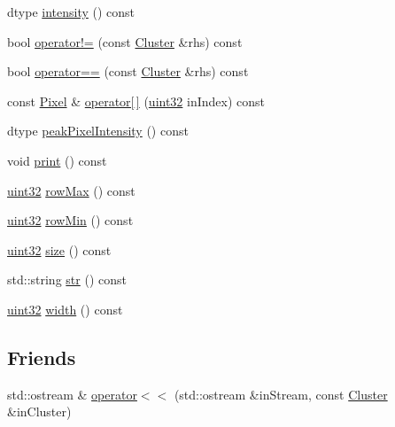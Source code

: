 \begin{DoxyCompactItemize}
\item 
dtype \mbox{\hyperlink{class_num_c_1_1_image_processing_1_1_cluster_ad68801ae625be617a59bff60131b34e6}{intensity}} () const
\item 
bool \mbox{\hyperlink{class_num_c_1_1_image_processing_1_1_cluster_ae27f961f8a5b5163c8dcf5858a3b2848}{operator!=}} (const \mbox{\hyperlink{class_num_c_1_1_image_processing_1_1_cluster}{Cluster}} \&rhs) const
\item 
bool \mbox{\hyperlink{class_num_c_1_1_image_processing_1_1_cluster_acaac2e9dd8ace9ccc1f84238d58fcaa8}{operator==}} (const \mbox{\hyperlink{class_num_c_1_1_image_processing_1_1_cluster}{Cluster}} \&rhs) const
\item 
const \mbox{\hyperlink{class_num_c_1_1_image_processing_1_1_pixel}{Pixel}} \& \mbox{\hyperlink{class_num_c_1_1_image_processing_1_1_cluster_a617555bb5a4a74b8e8c8327051275fd2}{operator\mbox{[}$\,$\mbox{]}}} (\mbox{\hyperlink{namespace_num_c_ae685802ca6d3035f2b400b081e3953fa}{uint32}} in\+Index) const
\item 
dtype \mbox{\hyperlink{class_num_c_1_1_image_processing_1_1_cluster_abf91ca832195383b222b0c68b367a131}{peak\+Pixel\+Intensity}} () const
\item 
void \mbox{\hyperlink{class_num_c_1_1_image_processing_1_1_cluster_a0315ecfcc3c448adc605d86c21e529e3}{print}} () const
\item 
\mbox{\hyperlink{namespace_num_c_ae685802ca6d3035f2b400b081e3953fa}{uint32}} \mbox{\hyperlink{class_num_c_1_1_image_processing_1_1_cluster_a90036e75f85a60f0d8a55d7cf8975da5}{row\+Max}} () const
\item 
\mbox{\hyperlink{namespace_num_c_ae685802ca6d3035f2b400b081e3953fa}{uint32}} \mbox{\hyperlink{class_num_c_1_1_image_processing_1_1_cluster_a87ebe359c4ad0e5996d1f8fef7e572fa}{row\+Min}} () const
\item 
\mbox{\hyperlink{namespace_num_c_ae685802ca6d3035f2b400b081e3953fa}{uint32}} \mbox{\hyperlink{class_num_c_1_1_image_processing_1_1_cluster_a73749e4a4ae85d433c67affef75f019b}{size}} () const
\item 
std\+::string \mbox{\hyperlink{class_num_c_1_1_image_processing_1_1_cluster_a753a4cb019060eb265cd23c95ca7949c}{str}} () const
\item 
\mbox{\hyperlink{namespace_num_c_ae685802ca6d3035f2b400b081e3953fa}{uint32}} \mbox{\hyperlink{class_num_c_1_1_image_processing_1_1_cluster_ab6375f422745940b6df0cd9a888388a2}{width}} () const
\end{DoxyCompactItemize}
\subsection*{Friends}
\begin{DoxyCompactItemize}
\item 
std\+::ostream \& \mbox{\hyperlink{class_num_c_1_1_image_processing_1_1_cluster_a9b2341014fa476e2540940941d9dcb30}{operator$<$$<$}} (std\+::ostream \&in\+Stream, const \mbox{\hyperlink{class_num_c_1_1_image_processing_1_1_cluster}{Cluster}} \&in\+Cluster)
\end{DoxyCompactItemize}


